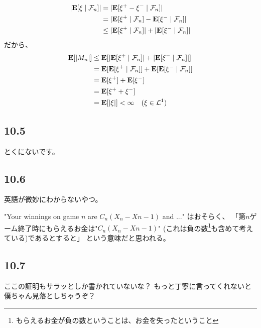         \begin{align*}
          |{\mathbf{E}}[\xi \mid \mathcal{F}_n]|
          &=|{\mathbf{E}}[\xi^+ - \xi^- \mid \mathcal{F}_n]|\\
          &= |{\mathbf{E}}[\xi^+ \mid \mathcal{F}_n] - {\mathbf{E}}[\xi^- \mid \mathcal{F}_n]|\\
          &\leq |{\mathbf{E}}[\xi^+ \mid \mathcal{F}_n]| + |{\mathbf{E}}[\xi^- \mid \mathcal{F}_n]|
        \end{align*}
        だから、
        \begin{align*}
          {\mathbf{E}}[|M_n|]
          &\leq {\mathbf{E}}[|{\mathbf{E}}[\xi^+ \mid \mathcal{F}_n]| + |{\mathbf{E}}[\xi^- \mid \mathcal{F}_n]|]\\
          &= {\mathbf{E}}[{\mathbf{E}}[\xi^+ \mid \mathcal{F}_n]] + {\mathbf{E}}[{\mathbf{E}}[\xi^- \mid \mathcal{F}_n]]\\
          &= {\mathbf{E}}[\xi^+] + {\mathbf{E}}[\xi^-]\\
          &= {\mathbf{E}}[\xi^+ + \xi^-]\\
          &= {\mathbf{E}}[|\xi |] < \infty \quad (\xi \in \mathcal{L}^1)
        \end{align*}

    \subsection{10.5}
      とくにないです。

    \subsection{10.6}
      英語が微妙にわからないやつ。

      "Your winnings on game $n$ are $C_n(X_n - X{n-1})$ and ..."
      はおそらく、
      「第$n$ゲーム終了時にもらえるお金は"$C_n(X_n - X{n-1})$"
      (これは負の数\footnote{もらえるお金が負の数ということは、お金を失ったということ}も含めて考えている)であるとすると」
      という意味だと思われる。

    \subsection{10.7}
      ここの証明もサラッとしか書かれていないな？
      もっと丁寧に言ってくれないと僕ちゃん見落としちゃうぞ？
